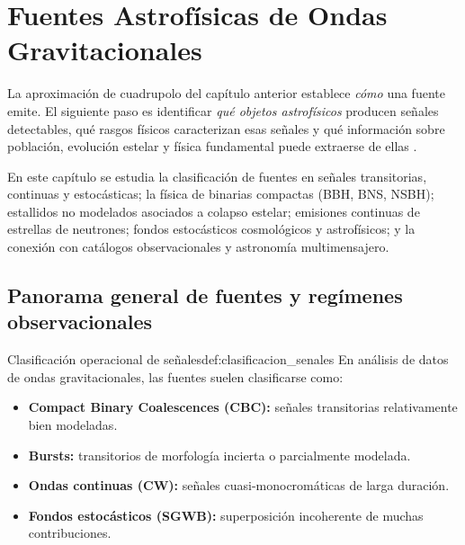
\chapter{Fuentes Astrofísicas de Ondas Gravitacionales}
\label{cap:fuentes_astro_og}

La aproximación de cuadrupolo del capítulo anterior establece \emph{cómo} una fuente emite. El siguiente paso es identificar \emph{qué objetos astrofísicos} producen señales detectables, qué rasgos físicos caracterizan esas señales y qué información sobre población, evolución estelar y física fundamental puede extraerse de ellas \cite{Maggiore2007, Maggiore2018, Thorne1987, GWTC1, GWTC3}.

En este capítulo se estudia la clasificación de fuentes en señales transitorias, continuas y estocásticas; la física de binarias compactas (BBH, BNS, NSBH); estallidos no modelados asociados a colapso estelar; emisiones continuas de estrellas de neutrones; fondos estocásticos cosmológicos y astrofísicos; y la conexión con catálogos observacionales y astronomía multimensajero.

\section{Panorama general de fuentes y regímenes observacionales}
\label{sec:panorama_fuentes}

\begin{definicion}{Clasificación operacional de señales}{def:clasificacion_senales}
En análisis de datos de ondas gravitacionales, las fuentes suelen clasificarse como:
\begin{itemize}[leftmargin=2em]
  \item \textbf{Compact Binary Coalescences (CBC):} señales transitorias relativamente bien modeladas.
  \item \textbf{Bursts:} transitorios de morfología incierta o parcialmente modelada.
  \item \textbf{Ondas continuas (CW):} señales cuasi-monocromáticas de larga duración.
  \item \textbf{Fondos estocásticos (SGWB):} superposición incoherente de muchas contribuciones.
\end{itemize}
\end{definicion}

